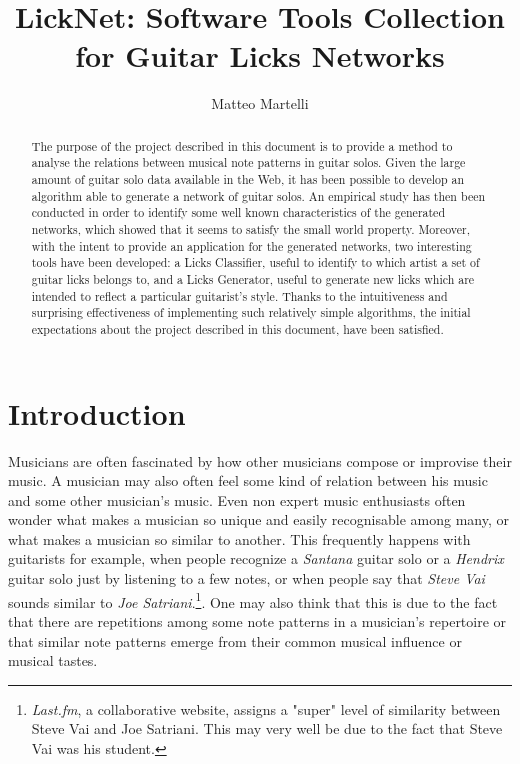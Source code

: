 \documentclass{llncs}
\title{LickNet: Software Tools Collection for Guitar Licks Networks}
\author{Matteo Martelli}
\institute{
	University of Bologna\\ 
	\email{matteo.martelli9@studio.unibo.it}
}
\begin{document}
\maketitle

\begin{abstract}
The purpose of the project described in this document is to provide a
method to analyse the relations between musical note patterns 
in guitar solos.
Given the large amount of guitar solo data available in the Web, it has been possible to
 develop an algorithm able to generate a network of guitar solos.
An empirical study has then been conducted in
order to identify some well known characteristics of the generated
networks, which showed that it seems to satisfy the small world
property\cite{sw-watts}. Moreover, with the intent to provide an application
for the generated networks, two interesting tools have been developed:
a Licks Classifier, useful to identify to which artist a set of
guitar licks belongs to, and a Licks Generator, useful to generate new
licks which are intended to reflect a particular guitarist's style. 
Thanks to the intuitiveness and surprising effectiveness of implementing such
relatively simple algorithms, the initial expectations about the project
described in this document,
have been satisfied.
\end{abstract}
\section{Introduction}
Musicians are often fascinated by how other musicians compose or
improvise their music. A musician may also often feel some kind of relation between his
music and some other musician's music.
Even non expert music enthusiasts often wonder what makes a 
musician so unique and easily recognisable among many, or what makes a
musician so similar to another. This frequently happens with guitarists for example, when people recognize 
a \emph{Santana} guitar solo or a \emph{Hendrix} guitar solo just by listening 
 to a few notes, or when people
say that \emph{Steve Vai} sounds similar to \emph{Joe
Satriani}.\footnote{\emph{Last.fm}, a
collaborative website, assigns a "super" level of similarity between Steve Vai
and Joe Satriani. This may very well be due to the fact that Steve Vai was his student.}.
One may also think that this is due to the fact that there are repetitions among some note patterns
in a musician's repertoire or that similar note patterns emerge from their common musical influence or musical tastes.
\end{document}
